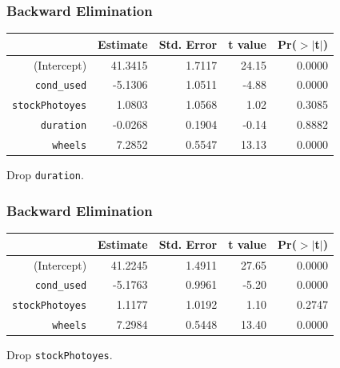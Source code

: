 \documentclass[handout]{beamer}
\newcommand{\blue}[1]{\textcolor{blue2}{#1}}
\begin{document}
\begin{frame}[fragile]
\frametitle{Backward Elimination}
\begin{table}[ht]
\centering
\begin{tabular}{r|rrrr}
  \hline
 & Estimate & Std. Error & t value & Pr($>$$|$t$|$) \\ 
  \hline
(Intercept) & 41.3415 & 1.7117 & 24.15 & 0.0000 \\ 
  {\tt cond\_used} & -5.1306 & 1.0511 & -4.88 & 0.0000 \\ 
  {\tt stockPhotoyes} & 1.0803 & 1.0568 & 1.02 & 0.3085 \\ 
  \blue{{\tt duration}} & \blue{-0.0268} & \blue{0.1904} & \blue{-0.14} & \blue{0.8882} \\ 
  {\tt wheels} & 7.2852 & 0.5547 & 13.13 & 0.0000 \\ 
   \hline
\end{tabular}
\end{table}
Drop {\tt duration}.

\end{frame}


\begin{frame}[fragile]
\frametitle{Backward Elimination}
\begin{table}[ht]
\centering
\begin{tabular}{rrrrr}
  \hline
 & Estimate & Std. Error & t value & Pr($>$$|$t$|$) \\ 
  \hline
(Intercept) & 41.2245 & 1.4911 & 27.65 & 0.0000 \\ 
  {\tt cond\_used} & -5.1763 & 0.9961 & -5.20 & 0.0000 \\ 
  \blue{{\tt stockPhotoyes}} & \blue{1.1177} & \blue{1.0192} & \blue{1.10} & \blue{0.2747} \\ 
  {\tt wheels} & 7.2984 & 0.5448 & 13.40 & 0.0000 \\ 
   \hline
\end{tabular}
\end{table}
Drop {\tt stockPhotoyes}.

\end{frame}
\end{document}
